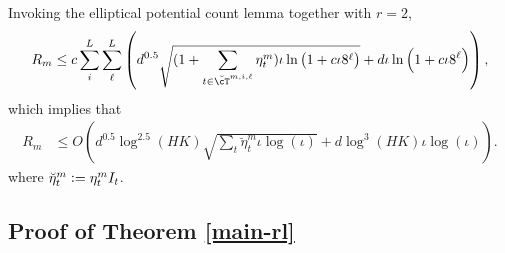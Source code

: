 Invoking the elliptical potential count lemma together with $r=2$,
\begin{align*}
  R_m \le c\sum_{i}^{L} \sum_{\ell}^{L}   \del{d^{0.5}\sqrt{(1+ \sum_{t\in\brcT^{m,i,\ell}}\eta^m_{t})\iota \ln\del{1+c\iota 8^\ell} } + d \iota\ln\del{1+c\iota 8^\ell} },
\end{align*}
which implies that
\begin{align*}
  R_m &\le  O\left(d^{0.5}\log^{2.5}(HK)\sqrt{\sum_{t} \breve\eta^m_t \iota \log(\iota )}+d \log^3(HK)\iota \log(\iota)\right).
\end{align*}
where $\breve\eta^m_t := \eta^m_t I_t$.


\subsection{Proof of Theorem \ref{main-rl}}\label{proof_of_rl}

